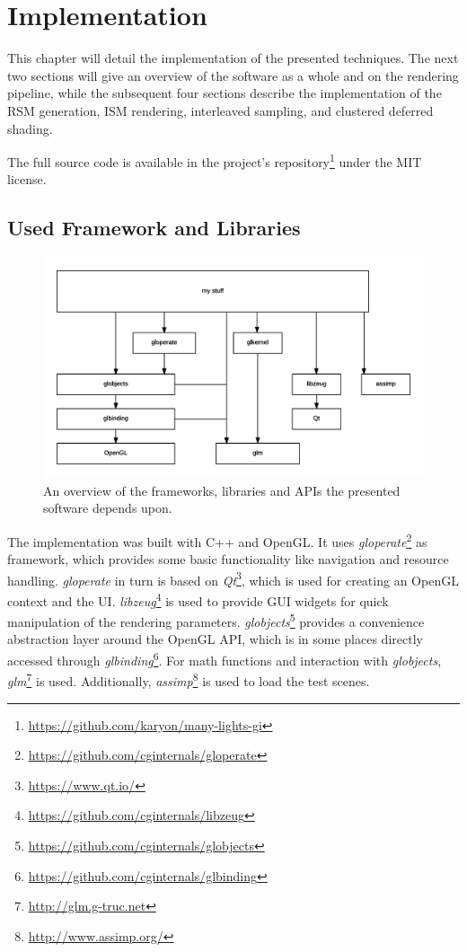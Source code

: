 

\chapter{Implementation}
\label{chap:implementation}

This chapter will detail the implementation of the presented techniques. The next two sections will give an overview of the software as a whole and on the rendering pipeline, while the subsequent four sections describe the implementation of the RSM generation, ISM rendering, interleaved sampling, and clustered deferred shading.

The full source code is available in the project's repository\footnote{\url{https://github.com/karyon/many-lights-gi}} under the MIT license.


\section{Used Framework and Libraries}

\begin{figure}[htbp]
  \centering
  \includegraphics{graphics/Architecture}
  \caption{An overview of the frameworks, libraries and APIs the presented software depends upon.}
\end{figure}

The implementation was built with C++ and OpenGL. It uses \textit{gloperate}\footnote{\url{https://github.com/cginternals/gloperate}} as framework, which provides some basic functionality like navigation and resource handling. \textit{gloperate} in turn is based on \textit{Qt}\footnote{\url{https://www.qt.io/}}, which is used for creating an OpenGL context and the UI. \textit{libzeug}\footnote{\url{https://github.com/cginternals/libzeug}} is used to provide GUI widgets for quick manipulation of the rendering parameters. \textit{globjects}\footnote{\url{https://github.com/cginternals/globjects}} provides a convenience abstraction layer around the OpenGL API, which is in some places directly accessed through \textit{glbinding}\footnote{\url{https://github.com/cginternals/glbinding}}. For math functions and interaction with \textit{globjects}, \textit{glm}\footnote{\url{http://glm.g-truc.net}} is used. Additionally, \textit{assimp}\footnote{\url{http://www.assimp.org/}} is used to load the test scenes.


